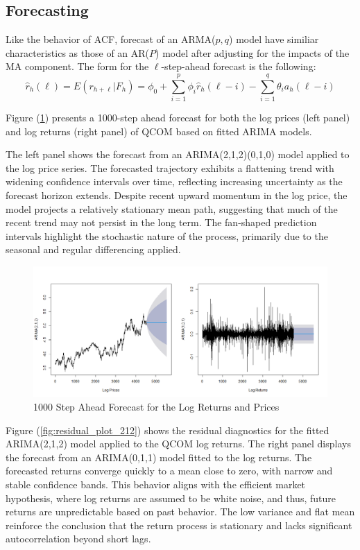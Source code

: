 \documentclass[12pt]{article}
\begin{document}
\subsection*{Forecasting}

Like the behavior of ACF, forecast of an ARMA($p,q$) model have similiar characteristics as those of an AR($P$) model after adjusting for the impacts of the MA component. The form for the $\ell$-step-ahead forecast is the following:
\begin{equation}
	\hat{r}_h(\ell)=E(r_{h+\ell}|F_h)=\phi_0+\sum_{i=1}^{p}\phi_i\hat{r}_h(\ell-i)-\sum_{i=1}^{q}\theta_ia_h(\ell-i)
\end{equation}

Figure (\ref{fig:forecast}) presents a 1000-step ahead forecast for both the log prices (left panel) and log returns (right panel) of QCOM based on fitted ARIMA models.

The left panel shows the forecast from an ARIMA(2,1,2)(0,1,0) model applied to the log price series. The forecasted trajectory exhibits a flattening trend with widening confidence intervals over time, reflecting increasing uncertainty as the forecast horizon extends. Despite recent upward momentum in the log price, the model projects a relatively stationary mean path, suggesting that much of the recent trend may not persist in the long term. The fan-shaped prediction intervals highlight the stochastic nature of the process, primarily due to the seasonal and regular differencing applied.

\begin{figure}[h]
	\centering
	\includegraphics[width=1\linewidth]{plots/forecast.png}
	\caption{1000 Step Ahead Forecast for the Log Returns and Prices}
	\label{fig:forecast}
\end{figure}

Figure (\ref{fig:residual_plot_212}) shows the residual diagnostics for the fitted ARIMA(2,1,2) model applied to the QCOM log returns. The right panel displays the forecast from an ARIMA(0,1,1) model fitted to the log returns. The forecasted returns converge quickly to a mean close to zero, with narrow and stable confidence bands. This behavior aligns with the efficient market hypothesis, where log returns are assumed to be white noise, and thus, future returns are unpredictable based on past behavior. The low variance and flat mean reinforce the conclusion that the return process is stationary and lacks significant autocorrelation beyond short lags.
\end{document}
